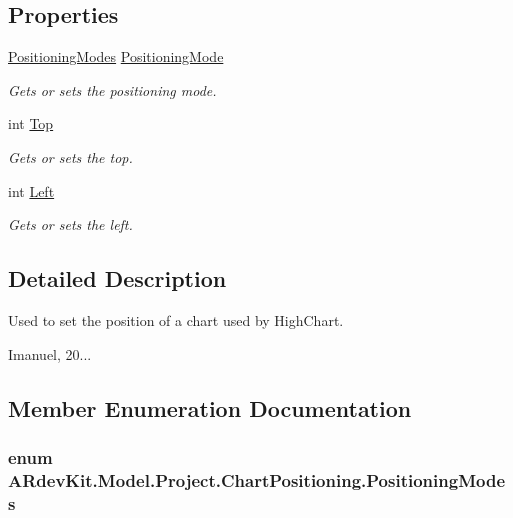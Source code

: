 \subsection*{Properties}
\begin{DoxyCompactItemize}
\item 
\hyperlink{class_a_rdev_kit_1_1_model_1_1_project_1_1_chart_positioning_ab74042f3d8ce77f994987c15831d76a2}{Positioning\-Modes} \hyperlink{class_a_rdev_kit_1_1_model_1_1_project_1_1_chart_positioning_adae5996b4fe2ac69c164ab256037ec5f}{Positioning\-Mode}
\begin{DoxyCompactList}\small\item\em Gets or sets the positioning mode. \end{DoxyCompactList}\item 
int \hyperlink{class_a_rdev_kit_1_1_model_1_1_project_1_1_chart_positioning_a0853d6ce2e37038ba62f051285ebf2ca}{Top}
\begin{DoxyCompactList}\small\item\em Gets or sets the top. \end{DoxyCompactList}\item 
int \hyperlink{class_a_rdev_kit_1_1_model_1_1_project_1_1_chart_positioning_adc4b121079440c2d28c2ac86f7ee200a}{Left}
\begin{DoxyCompactList}\small\item\em Gets or sets the left. \end{DoxyCompactList}\end{DoxyCompactItemize}


\subsection{Detailed Description}
Used to set the position of a chart used by High\-Chart. 

Imanuel, 20... 

\subsection{Member Enumeration Documentation}
\hypertarget{class_a_rdev_kit_1_1_model_1_1_project_1_1_chart_positioning_ab74042f3d8ce77f994987c15831d76a2}{
\subsubsection[{Positioning\-Modes}]{\setlength{\rightskip}{0pt plus 5cm}enum {\bf A\-Rdev\-Kit.\-Model.\-Project.\-Chart\-Positioning.\-Positioning\-Modes}}}\label{class_a_rdev_kit_1_1_model_1_1_project_1_1_chart_positioning_ab74042f3d8ce77f994987c15831d76a2}


